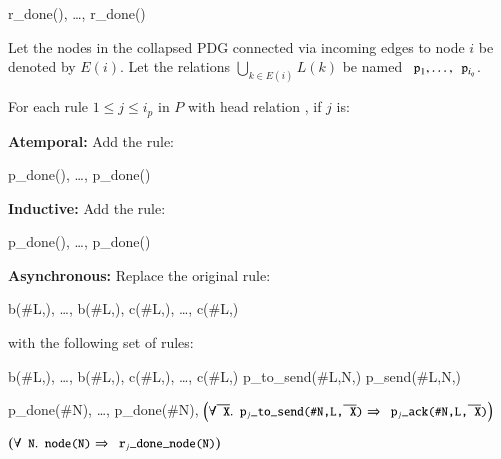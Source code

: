 \begin{Drules}
        {r_done(), \ldots, r_done()}
\end{Drules}

Let the nodes in the collapsed PDG connected via incoming edges to node $i$ be denoted by $E(i)$.  Let the relations $\bigcup_{k \in E(i)} L(k)$ be named $\dedalus{p}_1, \ldots, \dedalus{p}_{i_q}$.

For each rule $1 \leq j \leq i_p$ in $P$ with head relation , if $j$ is:

\noindent
\textbf{Atemporal:}
Add the rule:

\begin{Drules}
        {p_done(), \ldots, p_done()}
\end{Drules}

\noindent
\textbf{Inductive:}
Add the rule:

\begin{Drules}
        {p_done(), \ldots, p_done()}
\end{Drules}

\noindent
\textbf{Asynchronous:}
Replace the original rule:

\begin{Drules}
        {b(#L,), \ldots, b(#L,), c(#L,), \ldots, c(#L,)}
\end{Drules}

with the following set of rules:

\begin{Drules}
      {b(#L,), \ldots, b(#L,), c(#L,), \ldots, c(#L,)}
      {p_to_send(#L,N,)}
      {p_send(#L,N,)}

      {p_done(#N), \ldots, p_done(#N), \(\left(\forall \od{X} . \dedalus{p\sub{j}_to_send(#N,L,\od{X})} \Rightarrow \dedalus{p\sub{j}_ack(#N,L,\od{X})}\right)\)}

      {\(\left(\forall \dedalus{N} . \dedalus{node(N)} \Rightarrow \dedalus{r\sub{j}_done_node(N)}\right)\)}
\end{Drules}

